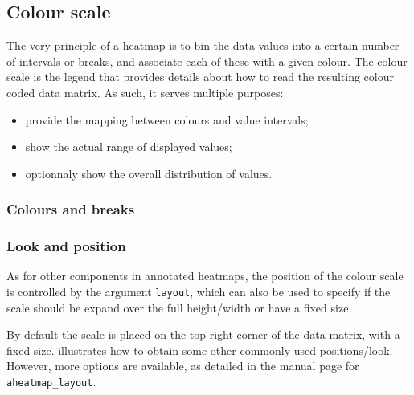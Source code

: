 \documentclass[a4paper]{article}\usepackage[]{graphicx}\usepackage[]{color}
\let\code=\texttt
\begin{document}
\subsection{Colour scale}
The very principle of a heatmap is to bin the data values into a certain number
of intervals or breaks, and associate each of these with a given colour.
The colour scale is the legend that provides details about how to read the
resulting colour coded data matrix.
As such, it serves multiple purposes:
\begin{itemize}
  \item provide the mapping between colours and value intervals;
  \item show the actual range of displayed values;
  \item optionnaly show the overall distribution of values.
\end{itemize}

\subsubsection{Colours and breaks}

\subsubsection{Look and position}
As for other components in annotated heatmaps, the position of the
colour scale is controlled by the argument \code{layout}, which can also be used
to specify if the scale should be expand over the full height/width or have a
fixed size.

By default the scale is placed on the top-right corner of the data matrix, with
a fixed size.
 illustrates how to obtain some other commonly used
positions/look.
However, more options are available, as detailed in the manual page for
\code{aheatmap\_layout}.
\end{document}

